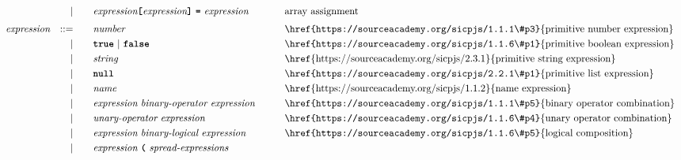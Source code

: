 \begin{alignat*}{9}
&&                       && |   &\quad && \textit{expression} \textbf{\texttt{[}}
                                          \textit{expression} \textbf{\texttt{]}} \ 
                                           \textbf{\texttt{=}}\  \textit{expression} 
                                                           && \textrm{array assignment} \\[1mm]
&& \textit{expression}   && ::= &\quad &&  \textit{number}   && \textrm{\href{https://sourceacademy.org/sicpjs/1.1.1\#p3}{primitive number expression}}\\
&&                       && |   &\quad && \textbf{\texttt{true}}\ |\ \textbf{\texttt{false}}
                                                           && \textrm{\href{https://sourceacademy.org/sicpjs/1.1.6\#p1}{primitive boolean expression}}\\
&&                       && |   &\quad &&  \textit{string}   && \textrm{\href{https://sourceacademy.org/sicpjs/2.3.1}{primitive string expression}} \\
&&                       && |   &\quad && \textbf{\texttt{null}}
                                                           && \textrm{\href{https://sourceacademy.org/sicpjs/2.2.1\#p1}{primitive list expression}} \\
&&                       && |   &\quad &&  \textit{name}   && \textrm{\href{https://sourceacademy.org/sicpjs/1.1.2}{name expression}} \\
&&                       && |   &\quad &&  \textit{expression} \  \textit{binary-operator} \ 
                                            \textit{expression} \qquad
                                                           && \textrm{\href{https://sourceacademy.org/sicpjs/1.1.1\#p5}{binary operator combination}} \\
&&                       && |   &\quad &&   \textit{unary-operator} \ 
                                            \textit{expression}
                                                           && \textrm{\href{https://sourceacademy.org/sicpjs/1.1.6\#p4}{unary operator combination}}\\
&&                       && |   &\quad &&  \textit{expression} \  \textit{binary-logical} \ 
                                            \textit{expression} \qquad
                                                           && \textrm{\href{https://sourceacademy.org/sicpjs/1.1.6\#p5}{logical composition}}\\
&&                       && |   &\quad &&   \textit{expression} \ 
                                            \textbf{\texttt{(}}\ \textit{spread-expressions}\

\end{alignat*}
